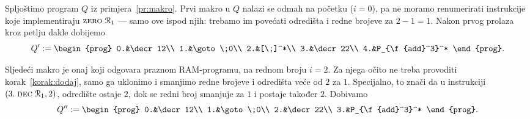 \begin{primjer}\label{pr:flat}
Spljoštimo program $Q$ iz primjera~\ref{pr:makro}. Prvi makro u $Q$ nalazi se odmah na početku ($i=0$), pa ne moramo renumerirati instrukcije koje implementiraju $\textsc{zero}\;\mathcal R_{1}$ --- samo ove ispod njih: trebamo im povećati odredišta i redne brojeve za $2-1=1$. Nakon prvog prolaza kroz petlju dakle dobijemo
\begin{equation}
    Q':=\begin{prog}
    0.&\decr12\\
    1.&\goto\;0\\
    2.&[\;]^*\\
    3.&\decr22\\
    4.&P_{\f{add}^3}^*
    \end{prog}\text.
\end{equation}

Sljedeći makro je onaj koji odgovara praznom RAM-programu, na rednom broju $i=2$. Za njega očito ne treba provoditi korak~\ref{korak:dodaj}, samo ga uklonimo i smanjimo redne brojeve i odredišta veće od $2$ za $1$. Specijalno, to znači da u instrukciji $(3.\;\textsc{dec}\;\mathcal R_{1},2)$, odredište ostaje $2$, dok se redni broj smanjuje za $1$ i postaje također $2$. Dobivamo
\begin{equation}
    Q'':=\begin{prog}
    0.&\decr12\\
    1.&\goto\;0\\
    2.&\decr22\\
    3.&P_{\f{add}^3}^*
    \end{prog}\text.
\end{equation}


\end{primjer}
